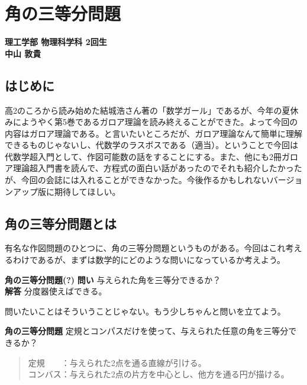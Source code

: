\chapter{角の三等分問題}
\vspace{-45pt} %
\begin{flushright}
  {\bf \large 理工学部 物理科学科 2回生} \\ \vspace{3pt} %
  {\bf \large 中山 敦貴} \\ \vspace{30pt} %
\end{flushright}

\section*{はじめに}
高2のころから読み始めた結城浩さん著の「数学ガール」であるが、今年の夏休みにようやく第5巻であるガロア理論を読み終えることができた。よって今回の内容はガロア理論である。と言いたいところだが、ガロア理論なんて簡単に理解できるものじゃないし、代数学のラスボスである（適当）。ということで今回は代数学超入門として、作図可能数の話をすることにする。また、他にも2冊ガロア理論超入門書を読んで、方程式の面白い話があったのでそれも紹介したかったが、今回の会誌には入れることができなかった。今後作るかもしれないバージョンアップ版に期待してほしい。

%
\section{角の三等分問題とは}
有名な作図問題のひとつに、角の三等分問題というものがある。今回はこれ考えるわけであるが、まずは数学的にどのような問いになっているか考えよう。
\begin{itembox}[l]{\bf 角の三等分問題(?)}
{\bf 問い} 与えられた角を三等分できるか？\\
{\bf 解答} 分度器使えばできる。
\end{itembox}
\par 問いたいことはそういうことじゃない。もう少しちゃんと問いを立てよう。\\

\begin{itembox}[l]{\bf 角の三等分問題}
{\gt 定規}と{\gt コンパス}だけを使って、与えられた{\gt 任意の}角を三等分できるか？
\end{itembox}

\begin{quote}
{\gt 定規}　　：与えられた2点を通る直線が引ける。\\
{\gt コンバス}：与えられた2点の片方を中心とし、他方を通る円が描ける。
\end{quote}

